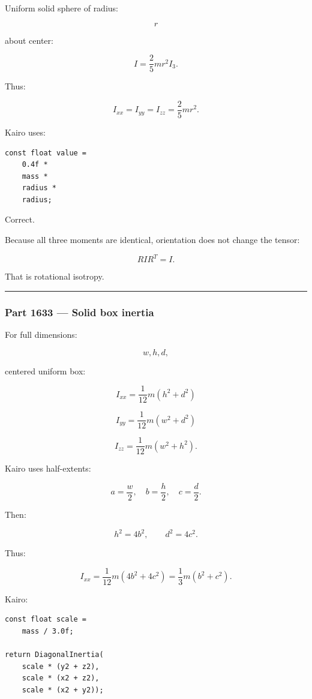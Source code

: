 Uniform solid sphere of radius:

\[
r
\]

about center:

\[
\boxed{
I
=
\frac25mr^2I_3.
}
\]

Thus:

\[
I_{xx}
=
I_{yy}
=
I_{zz}
=
\frac25mr^2.
\]

Kairo uses:

\begin{verbatim}
const float value =
    0.4f *
    mass *
    radius *
    radius;
\end{verbatim}

Correct.

Because all three moments are identical, orientation does not change the tensor:

\[
RI R^T=I.
\]

That is rotational isotropy.

\begin{center}\rule{0.5\linewidth}{0.5pt}\end{center}

\subsubsection{Part 1633 --- Solid box inertia}\label{part-1633-solid-box-inertia}

For full dimensions:

\[
w,h,d,
\]

centered uniform box:

\[
I_{xx}
=
\frac{1}{12}m(h^2+d^2)
\]

\[
I_{yy}
=
\frac{1}{12}m(w^2+d^2)
\]

\[
I_{zz}
=
\frac{1}{12}m(w^2+h^2).
\]

Kairo uses half-extents:

\[
a=\frac w2,\quad
b=\frac h2,\quad
c=\frac d2.
\]

Then:

\[
h^2=4b^2,\qquad
d^2=4c^2.
\]

Thus:

\[
I_{xx}
=
\frac{1}{12}m(4b^2+4c^2)
=
\frac13m(b^2+c^2).
\]

Kairo:

\begin{verbatim}
const float scale =
    mass / 3.0f;

return DiagonalInertia(
    scale * (y2 + z2),
    scale * (x2 + z2),
    scale * (x2 + y2));
\end{verbatim}


